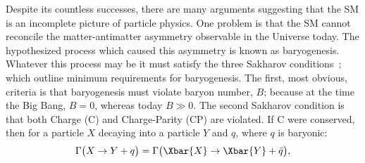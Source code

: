 Despite its countless successes,
there are many arguments suggesting that the SM is an incomplete
picture of particle physics.
One problem is that the SM cannot reconcile the matter-antimatter asymmetry observable in the
Universe today.
The hypothesized process which caused this asymmetry is known as baryogenesis.
Whatever this process may be it must satisfy the three Sakharov
conditions~\cite{1991SvPhU..34..392S}; which outline minimum requirements for baryogenesis.
The first, most obvious, criteria is that baryogenesis must violate baryon number, $B$; because at
the time the Big Bang, $B=0$, whereas today $B\gg0$.
The second Sakharov condition is that both Charge (C) and Charge-Parity (CP) are violated.
If C were conserved, then for a particle $X$ decaying into a particle $Y$ and $q$, where $q$ is
baryonic:
\begin{equation}
  \Gamma\big(X\to Y+q\big)=\Gamma\big(\Xbar{X} \to \Xbar{Y}+\bar q\big),
\end{equation}
